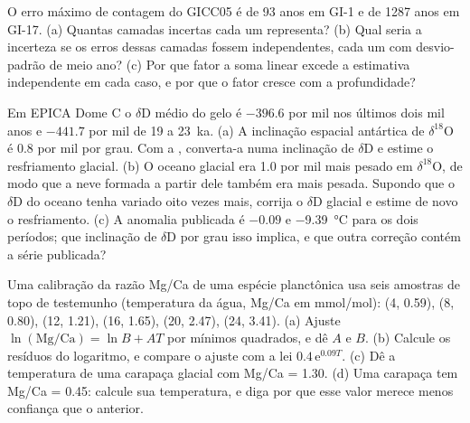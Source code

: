 \begin{exercise}[$\star\star$]\label{exo:b2:climate-proxies:9}
O erro máximo de contagem do GICC05 é de 93 anos em GI-1 e de \num{1287} anos em GI-17. (a) Quantas
camadas incertas cada um representa? (b) Qual seria a incerteza se os erros dessas
camadas fossem independentes, cada um com desvio-padrão de meio ano? (c) Por que fator a
soma linear excede a estimativa independente em cada caso, e por que o fator cresce com a profundidade?
\end{exercise}

\begin{exercise}[$\star\star\star$]\label{exo:b2:climate-proxies:10}
Em EPICA Dome C o $\delta$D médio do gelo é $-396.6$ por mil nos últimos dois mil anos
e $-441.7$ por mil de 19 a \qty{23}{ka}. (a) A inclinação espacial antártica de $\delta^{18}$O é
\num{0.8} por mil por grau. Com a , converta-a numa inclinação de $\delta$D e
estime o resfriamento glacial. (b) O oceano glacial era \num{1.0} por mil mais pesado em
$\delta^{18}$O, de modo que a neve formada a partir dele também era mais pesada. Supondo que o $\delta$D do oceano
tenha variado oito vezes mais, corrija o $\delta$D glacial e estime de novo o resfriamento.
(c) A anomalia publicada é $-0.09$ e \qty{-9.39}{\celsius} para os dois períodos; que inclinação de
$\delta$D por grau isso implica, e que outra correção contém a série publicada?
\end{exercise}

\begin{exercise}[$\star\star\star$]\label{exo:b2:climate-proxies:11}
Uma calibração da razão Mg/Ca de uma espécie planctônica usa seis amostras de topo de testemunho (temperatura da água,
Mg/Ca em \unit{mmol/mol}): (4, 0.59), (8, 0.80), (12, 1.21), (16, 1.65), (20, 2.47), (24, 3.41).
(a) Ajuste $\ln(\text{Mg/Ca}) = \ln B + AT$ por mínimos quadrados, e dê $A$ e $B$. (b) Calcule os
resíduos do logaritmo, e compare o ajuste com a lei $0.4\,\mathrm{e}^{0.09T}$. (c) Dê a
temperatura de uma carapaça glacial com Mg/Ca = 1.30. (d) Uma carapaça tem Mg/Ca = 0.45: calcule sua
temperatura, e diga por que esse valor merece menos confiança que o anterior.
\end{exercise}

